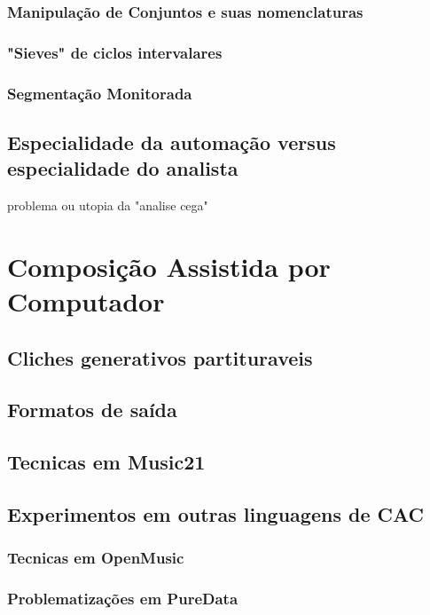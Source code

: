 \documentclass[
	12pt,				%
	openright,			%
	twoside,			%
	a4paper,			%
	english,			%
	french,				%
	spanish,			%
	brazil				%
	]{abntex2}
\begin{document}
\subsection{Manipulação de Conjuntos e suas nomenclaturas}

\subsection{"Sieves" de ciclos intervalares}

\subsection{Segmentação Monitorada}


\section{Especialidade da automação versus especialidade do analista}

problema ou utopia da "analise cega"


\chapter{Composição Assistida por Computador}

\section{Cliches generativos partituraveis}



\section{Formatos de saída}

\section{Tecnicas em Music21}

\section{Experimentos em outras linguagens de CAC}

\subsection{Tecnicas em OpenMusic}

\subsection{Problematizações em PureData}
\end{document}

